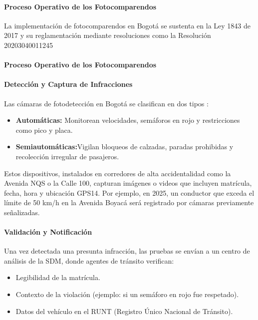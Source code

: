 \documentclass[
    letterpaper, 
    man,   
    spanish,
    12pt,
    donotrepeattitle,
    floatsintext,
    hidelinks %
]{apa7}
\begin{document}
\paragraph{Proceso Operativo de los Fotocomparendos} La implementación de fotocomparendos en Bogotá se sustenta en la Ley 1843 de 2017 \parencite{ley1843} y su reglamentación mediante resoluciones como la Resolución 20203040011245

\paragraph{Proceso Operativo de los Fotocomparendos }
\paragraph{Detección y Captura de Infracciones }
Las cámaras de fotodetección en Bogotá se clasifican en dos tipos \parencite{supertransporte2021, mintransporte2023}: 

\begin{itemize}
    \item \textbf{Automáticas: }Monitorean velocidades, semáforos en rojo y restricciones como pico y placa.
    \item \textbf{Semiautomáticas:}Vigilan bloqueos de calzadas, paradas prohibidas y recolección irregular de pasajeros.
\end{itemize}

Estos dispositivos, instalados en corredores de alta accidentalidad como la Avenida NQS o la Calle 100, capturan imágenes o videos que incluyen matrícula, fecha, hora y ubicación GPS14. Por ejemplo, en 2025, un conductor que exceda el límite de 50 km/h en la Avenida Boyacá será registrado por cámaras previamente señalizadas. 

\paragraph{Validación y Notificación }
Una vez detectada una presunta infracción, las pruebas se envían a un centro de análisis de la SDM, donde agentes de tránsito verifican:

\begin{itemize}
    \item Legibilidad de la matrícula. 
    \item Contexto de la violación (ejemplo: si un semáforo en rojo fue respetado).
    \item Datos del vehículo en el RUNT (Registro Único Nacional de Tránsito).
\end{itemize}
\end{document}
